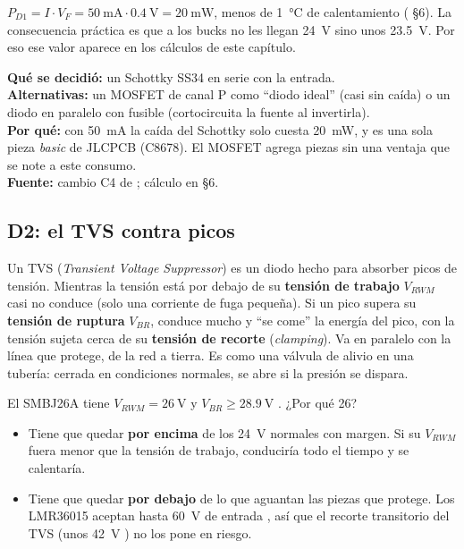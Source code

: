 \begin{calculo}[pérdida en D1]
$P_{D1} = I\cdot V_F = \SI{50}{\milli\ampere}\cdot\SI{0.4}{\volt} = \SI{20}{\milli\watt}$, menos de \SI{1}{\degreeCelsius} de calentamiento ( §6). La consecuencia práctica es que a los bucks no les llegan \SI{24}{\volt} sino unos \SI{23.5}{\volt}. Por eso ese valor aparece en los cálculos de este capítulo.
\end{calculo}

\begin{decision}
\textbf{Qué se decidió:} un Schottky SS34 en serie con la entrada.\\
\textbf{Alternativas:} un MOSFET de canal P como ``diodo ideal'' (casi sin caída) o un diodo en paralelo con fusible (cortocircuita la fuente al invertirla).\\
\textbf{Por qué:} con \SI{50}{\milli\ampere} la caída del Schottky solo cuesta \SI{20}{\milli\watt}, y es una sola pieza \emph{basic} de JLCPCB (C8678). El MOSFET agrega piezas sin una ventaja que se note a este consumo.\\
\textbf{Fuente:} cambio C4 de ; cálculo en  §6.
\end{decision}

\subsection{D2: el TVS contra picos}

\begin{idea}
Un TVS (\emph{Transient Voltage Suppressor}) es un diodo hecho para absorber picos de tensión. Mientras la tensión está por debajo de su \textbf{tensión de trabajo} $V_{RWM}$ casi no conduce (solo una corriente de fuga pequeña). Si un pico supera su \textbf{tensión de ruptura} $V_{BR}$, conduce mucho y ``se come'' la energía del pico, con la tensión sujeta cerca de su \textbf{tensión de recorte} (\emph{clamping}). Va en paralelo con la línea que protege, de la red a tierra. Es como una válvula de alivio en una tubería: cerrada en condiciones normales, se abre si la presión se dispara.
\end{idea}

El SMBJ26A tiene $V_{RWM}=\SI{26}{\volt}$ y $V_{BR}\geq\SI{28.9}{\volt}$ \copia. ¿Por qué 26?
\begin{itemize}
  \item Tiene que quedar \textbf{por encima} de los \SI{24}{\volt} normales con margen. Si su $V_{RWM}$ fuera menor que la tensión de trabajo, conduciría todo el tiempo y se calentaría.
  \item Tiene que quedar \textbf{por debajo} de lo que aguantan las piezas que protege. Los LMR36015 aceptan hasta \SI{60}{\volt} de entrada , así que el recorte transitorio del TVS (unos \SI{42}{\volt} \copia[(REGLAS.md §5)]) no los pone en riesgo.
\end{itemize}


